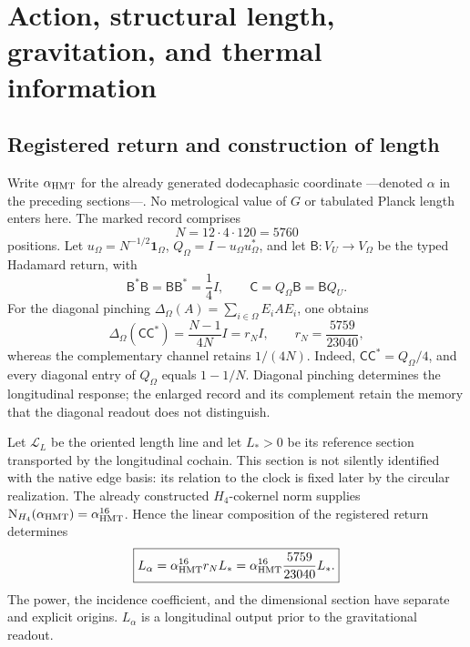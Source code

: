 \section{Action, structural length, gravitation, and thermal information}
\label{v:ant:sec:gravity}

\subsection{Registered return and construction of length}

Write $\alpha_{\mathrm{HMT}}$ for the already generated dodecaphasic coordinate
---denoted $\alpha$ in the preceding sections---. No metrological value of
$G$ or tabulated Planck length enters here. The marked record comprises
\begin{equation}
 N=12\cdot4\cdot120=5760
 \label{v:eq:cardinal-longitud-alpha}
\end{equation}
positions. Let $u_\Omega=N^{-1/2}\mathbf1_\Omega$,
$Q_\Omega=I-u_\Omega u_\Omega^*$, and let
$\mathsf B:V_U\to V_\Omega$ be the typed Hadamard return, with
\begin{equation}
 \mathsf B^*\mathsf B=\mathsf B\mathsf B^*=\frac14I,
 \qquad \mathsf C=Q_\Omega\mathsf B=\mathsf BQ_U.
 \label{v:eq:retorno-hadamard-longitud}
\end{equation}
For the diagonal pinching
$\Delta_\Omega(A)=\sum_{i\in\Omega}E_iAE_i$, one obtains
\begin{equation}
 \Delta_\Omega(\mathsf C\mathsf C^*)
 =\frac{N-1}{4N}I=r_NI,
 \qquad
 r_N=\frac{5759}{23040},
 \label{v:eq:residuo-longitud-alpha}
\end{equation}
whereas the complementary channel retains $1/(4N)$. Indeed,
$\mathsf C\mathsf C^*=Q_\Omega/4$, and every diagonal entry of
$Q_\Omega$ equals $1-1/N$. Diagonal pinching determines the longitudinal
response; the enlarged record and its complement retain the memory that the
diagonal readout does not distinguish.

Let $\mathcal L_L$ be the oriented length line and let $L_*>0$ be its
reference section transported by the longitudinal cochain. This section is
not silently identified with the native edge basis: its relation to the
clock is fixed later by the circular realization. The already constructed
$H_4$-cokernel norm supplies
$\mathrm N_{H_4}(\alpha_{\mathrm{HMT}})=\alpha_{\mathrm{HMT}}^{16}$. Hence the linear
composition of the registered return determines
\begin{equation}
 \boxed{
 L_\alpha=\alpha_{\mathrm{HMT}}^{16}r_NL_*
 =\alpha_{\mathrm{HMT}}^{16}\frac{5759}{23040}L_* .}
 \label{v:eq:longitud-alpha}
\end{equation}
The power, the incidence coefficient, and the dimensional section have
separate and explicit origins. $L_\alpha$ is a longitudinal output prior
to the gravitational readout.

